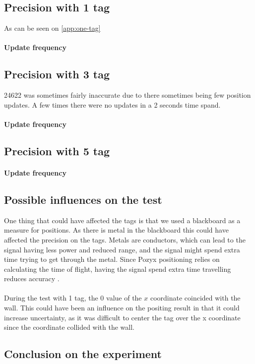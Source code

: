 \subsection{Precision with 1 tag} \label{sec:one-tag-precision}
As can be seen on \autoref{app:one-tag}

\paragraph{Update frequency}

\subsection{Precision with 3 tag}

24622 was sometimes fairly inaccurate due to there sometimes being few position updates. 
A few times there were no updates in a 2 seconds time spand.    

\paragraph{Update frequency}

\subsection{Precision with 5 tag}

\paragraph{Update frequency}

\subsection{Possible influences on the test}
One thing that could have affected the tags is that we used a blackboard as a measure for positions. 
As there is metal in the blackboard this could have affected the precision on the tags.
Metals are conductors, which can lead to the signal having less power and reduced range, and the signal might spend extra time trying to get through the metal.
Since Pozyx positioning relies on calculating the time of flight, having the signal spend extra time travelling reduces accuracy \cite{pozyx-UWBObstacles}. 
\\\\
During the test with 1 tag, the 0 value of the $x$ coordinate coincided with the wall. 
This could have been an influence on the positing result in that it could increase uncertainty, as it was difficult to center the tag over the x coordinate since the coordinate collided with the wall.

\subsection{Conclusion on the experiment}